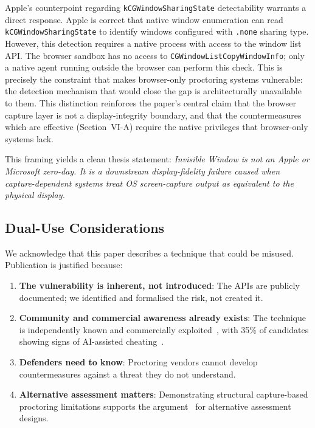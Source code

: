 \documentclass[conference]{IEEEtran}
\begin{document}
Apple's counterpoint regarding \texttt{kCGWindowSharingState} detectability warrants a direct response. Apple is correct that native window enumeration can read \texttt{kCGWindowSharingState} to identify windows configured with \texttt{.none} sharing type. However, this detection requires a native process with access to the window list API. The browser sandbox has no access to \texttt{CGWindowListCopyWindowInfo}; only a native agent running outside the browser can perform this check. This is precisely the constraint that makes browser-only proctoring systems vulnerable: the detection mechanism that would close the gap is architecturally unavailable to them. This distinction reinforces the paper's central claim that the browser capture layer is not a display-integrity boundary, and that the countermeasures which are effective (Section~VI-A) require the native privileges that browser-only systems lack.

This framing yields a clean thesis statement: \textit{Invisible Window is not an Apple or Microsoft zero-day. It is a downstream display-fidelity failure caused when capture-dependent systems treat OS screen-capture output as equivalent to the physical display.}

\subsection{Dual-Use Considerations}

We acknowledge that this paper describes a technique that could be misused. Publication is justified because:

\begin{enumerate}
\item \textbf{The vulnerability is inherent, not introduced}: The APIs are publicly documented; we identified and formalised the risk, not created it.
\item \textbf{Community and commercial awareness already exists}: The technique is independently known and commercially exploited~\cite{simko2024modern,interviewcoder2026,openpr2026interviewcoder,cluely2025,idanless2025anticapture,khorev2026ezzi,mayerr2025openinterviewcoder}, with 35\% of candidates showing signs of AI-assisted cheating~\cite{fabrichq2026cheating}.
\item \textbf{Defenders need to know}: Proctoring vendors cannot develop countermeasures against a threat they do not understand.
\item \textbf{Alternative assessment matters}: Demonstrating structural capture-based proctoring limitations supports the argument~\cite{khalil2022nexus,duncan2022necessity,paris2021sins} for alternative assessment designs.
\end{enumerate}
\end{document}
